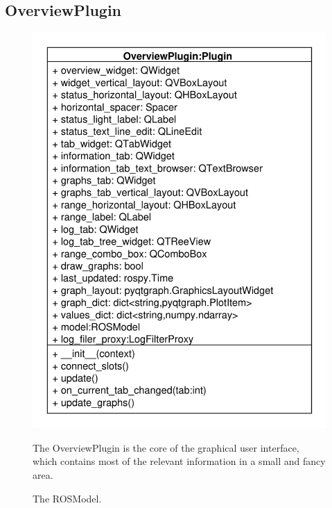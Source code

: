 \subsection{OverviewPlugin}
\begin{figure}[htbp]
	\begin{minipage}[t]{7cm}
		\vspace{0pt}
		\centering
		\includegraphics[scale=0.6]{./diagram_pictures/Overview.pdf}
		\caption{The ROSModel.}
	\end{minipage}
	\hfill
	\begin{minipage}[t]{6.5cm}
		\vspace{10pt}
		The OverviewPlugin is the core of the graphical user interface, which
		contains most of the relevant information in a small and fancy area.
	\end{minipage}
\end{figure} 
